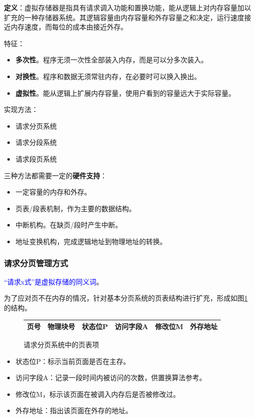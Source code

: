\documentclass[12pt, a4paper, oneside]{ctexart}
\begin{document}
\textbf{定义}：虚拟存储器是指具有请求调入功能和置换功能，能从逻辑上对内存容量加以扩充的一种存储器系统。其逻辑容量由内存容量和外存容量之和决定，运行速度接近内存速度，而每位的成本由接近外存。

特征：
\begin{itemize}
  \item {\bf 多次性}。程序无须一次性全部装入内存，而是可以分多次装入。
  \item {\bf 对换性}。程序和数据无须常驻内存，在必要时可以换入换出。
  \item {\bf 虚拟性}。能从逻辑上扩展内存容量，使用户看到的容量远大于实际容量。
\end{itemize}

实现方法：
\begin{itemize}
  \item 请求分页系统
  \item 请求分段系统
  \item 请求段页系统
\end{itemize}

三种方法都需要一定的\textbf{硬件支持}：
\begin{itemize}
  \item 一定容量的内存和外存。
  \item 页表/段表机制，作为主要的数据结构。
  \item 中断机构。在缺页/段时产生中断。
  \item 地址变换机构，完成逻辑地址到物理地址的转换。
\end{itemize}

\subsubsection{请求分页管理方式}

\textcolor{blue}{“请求x式”是虚拟存储的同义词}。

为了应对页不在内存的情况，针对基本分页系统的页表结构进行扩充，形成如图\ref{page_request_system}的结构。

\begin{figure}[h]
  \centering
  \begin{tabular}{|c|c|c|c|c|c|}
    \hline
    页号 & 物理块号 & 状态位P & 访问字段A & 修改位M & 外存地址 \\
    \hline
  \end{tabular}
  \caption{请求分页系统中的页表项}
  \label{page_request_system}
\end{figure}

\begin{itemize}
  \item 状态位P：标示当前页面是否在主存。
  \item 访问字段A：记录一段时间内被访问的次数，供置换算法参考。
  \item 修改位M，标示该页面在被调入内存后是否被修改过。
  \item 外存地址：指出该页面在外存的地址。
\end{itemize}
\end{document}
